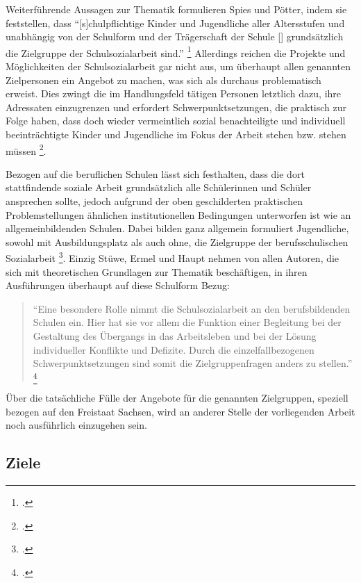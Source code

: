 \noindent
Weiterführende Aussagen zur Thematik formulieren Spies und Pötter, indem sie feststellen, dass "`[s]chulpflichtige Kinder und Jugendliche aller Altersstufen und unabhängig von der Schulform und der Trägerschaft der Schule [\punkte] grundsätzlich die Zielgruppe der Schulsozialarbeit sind."' \footcite[46]{Spies2011} Allerdings reichen die Projekte und Möglichkeiten der Schulsozialarbeit gar nicht aus, um überhaupt allen genannten Zielpersonen ein Angebot zu machen, was sich als durchaus problematisch erweist. Dies zwingt die im Handlungsfeld tätigen Personen letztlich dazu, ihre Adressaten einzugrenzen und erfordert Schwerpunktsetzungen, die praktisch zur Folge haben, dass doch wieder vermeintlich sozial benachteiligte und individuell beeinträchtigte Kinder und Jugendliche im Fokus der Arbeit stehen bzw. stehen müssen \footcite[vgl.][47]{Spies2011}.
 
Bezogen auf die beruflichen Schulen lässt sich festhalten, dass die dort stattfindende soziale Arbeit grundsätzlich alle Schülerinnen und Schüler ansprechen sollte, jedoch aufgrund der oben geschilderten praktischen Problemstellungen ähnlichen institutionellen Bedingungen unterworfen ist wie an allgemeinbildenden Schulen. Dabei  bilden ganz allgemein formuliert Jugendliche, sowohl mit Ausbildungsplatz als auch ohne, die Zielgruppe der berufsschulischen Sozialarbeit \footcite[vgl.][5]{ASSB2011}. Einzig Stüwe, Ermel und Haupt nehmen von allen Autoren, die sich mit theoretischen Grundlagen zur Thematik beschäftigen, in ihren Ausführungen überhaupt auf diese Schulform Bezug:

\begin{quotation}
\noindent
"`Eine besondere Rolle nimmt die Schulsozialarbeit an den berufsbildenden Schulen ein. Hier hat sie vor allem die Funktion einer Begleitung bei der Gestaltung des Übergangs in das Arbeitsleben und bei der Lösung individueller Konflikte und Defizite. Durch die einzelfallbezogenen Schwerpunktsetzungen sind somit die Zielgruppenfragen anders zu stellen."' \footcite[74]{Stuewe2015}
\end{quotation}

\noindent
Über die tatsächliche Fülle der Angebote für die genannten Zielgruppen, speziell bezogen auf den Freistaat Sachsen, wird an anderer Stelle der vorliegenden Arbeit noch ausführlich einzugehen sein. 

\subsection{Ziele}
\label{sec:Ziele}

